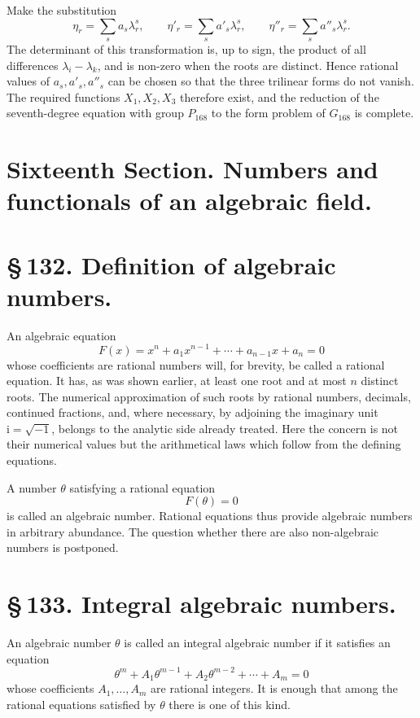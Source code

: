 \documentclass[11pt]{article}
\providecommand{\ii}{\mathrm{i}}
\begin{document}
Make the substitution
\begin{equation}
\eta_r=\sum_s a_s\lambda_r^s,
\qquad
\eta'_r=\sum_s a'_s\lambda_r^s,
\qquad
\eta''_r=\sum_s a''_s\lambda_r^s.
\tag{2}
\end{equation}
The determinant of this transformation is, up to sign, the product of all differences \(\lambda_i-\lambda_k\), and is non-zero when the roots are distinct. Hence rational values of \(a_s,a'_s,a''_s\) can be chosen so that the three trilinear forms do not vanish. The required functions \(X_1,X_2,X_3\) therefore exist, and the reduction of the seventh-degree equation with group \(P_{168}\) to the form problem of \(G_{168}\) is complete.




\section*{Sixteenth Section. Numbers and functionals of an algebraic field.}

\section*{\S\,132. Definition of algebraic numbers.}

An algebraic equation
\begin{equation}
F(x)=x^n+a_1x^{n-1}+\cdots +a_{n-1}x+a_n=0
\tag{1}
\end{equation}
whose coefficients are rational numbers will, for brevity, be called
a rational equation. It has, as was shown earlier, at least one root
and at most \(n\) distinct roots. The numerical approximation of such
roots by rational numbers, decimals, continued fractions, and, where
necessary, by adjoining the imaginary unit \(\ii=\sqrt{-1}\), belongs
to the analytic side already treated. Here the concern is not their
numerical values but the arithmetical laws which follow from the
defining equations.

A number \(\theta\) satisfying a rational equation
\[
F(\theta)=0
\]
is called an algebraic number. Rational equations thus provide
algebraic numbers in arbitrary abundance. The question whether there
are also non-algebraic numbers is postponed.

\section*{\S\,133. Integral algebraic numbers.}

An algebraic number \(\theta\) is called an integral algebraic number
if it satisfies an equation
\begin{equation}
\theta^m+A_1\theta^{m-1}+A_2\theta^{m-2}+\cdots +A_m=0
\tag{1}
\end{equation}
whose coefficients \(A_1,\ldots,A_m\) are rational integers. It is
enough that among the rational equations satisfied by \(\theta\) there
is one of this kind.
\end{document}
